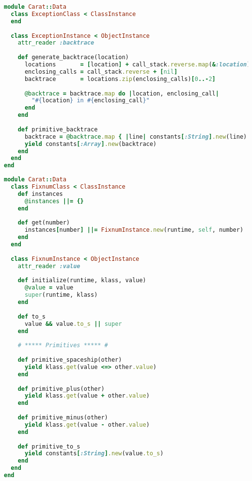\begin{lstlisting}[title={\small\Helvetica data/exception.rb},language=Ruby]
module Carat::Data
  class ExceptionClass < ClassInstance
  end
  
  class ExceptionInstance < ObjectInstance
    attr_reader :backtrace
    
    def generate_backtrace(location)
      locations       = [location] + call_stack.reverse.map(&:location)
      enclosing_calls = call_stack.reverse + [nil]
      backtrace       = locations.zip(enclosing_calls)[0..-2]
      
      @backtrace = backtrace.map do |location, enclosing_call|
        "#{location} in #{enclosing_call}"
      end
    end
    
    def primitive_backtrace
      backtrace = @backtrace.map { |line| constants[:String].new(line) }
      yield constants[:Array].new(backtrace)
    end
  end
end

\end{lstlisting}
\begin{lstlisting}[title={\small\Helvetica data/fixnum.rb},language=Ruby]
module Carat::Data
  class FixnumClass < ClassInstance
    def instances
      @instances ||= {}
    end
    
    def get(number)
      instances[number] ||= FixnumInstance.new(runtime, self, number)
    end
  end
  
  class FixnumInstance < ObjectInstance
    attr_reader :value
    
    def initialize(runtime, klass, value)
      @value = value
      super(runtime, klass)
    end
    
    def to_s
      value && value.to_s || super
    end
    
    # ***** Primitives ***** #
    
    def primitive_spaceship(other)
      yield klass.get(value <=> other.value)
    end
    
    def primitive_plus(other)
      yield klass.get(value + other.value)
    end
    
    def primitive_minus(other)
      yield klass.get(value - other.value)
    end
    
    def primitive_to_s
      yield constants[:String].new(value.to_s)
    end
  end
end

\end{lstlisting}
